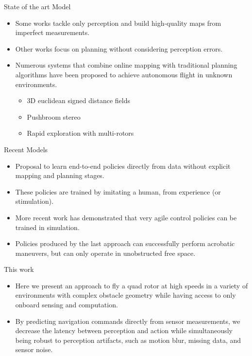 \documentclass{beamer}
\begin{document}
\begin{frame}{State of the art Model}
	\begin{itemize}
		\item Some works tackle only perception and build high-quality maps from imperfect measurements. 
		\item Other works focus on planning without considering perception errors. 
		\item Numerous systems that combine online mapping with traditional planning algorithms have been proposed to achieve autonomous flight in unknown environments.
		\begin{itemize}
			\item 3D euclidean signed distance fields
			\item Pushbroom stereo
			\item Rapid exploration with multi-rotors
		\end{itemize} 
	\end{itemize}
\end{frame}

\begin{frame}{Recent Models}
	\begin{itemize}
		\item Proposal to learn end-to-end policies directly from data without explicit mapping and planning stages. 
		\item These policies are trained by imitating a human, from experience (or stimulation). 
		\item More recent work has demonstrated that very agile control policies can be trained in simulation. 
		\item Policies produced by the last approach can successfully perform acrobatic maneuvers, but can only operate in unobstructed free space.
	\end{itemize}
\end{frame}

\begin{frame}{This work}
	\begin{itemize}
		\item Here we present an approach to fly a quad rotor at high speeds in a variety of environments with complex obstacle geometry while having access to only onboard sensing and computation. 
		\item By predicting navigation commands directly from sensor measurements, we decrease the latency between perception and action while simultaneously being robust to perception artifacts, such as motion blur, missing data, and sensor noise.
	\end{itemize}
	
\end{frame}
\end{document}
